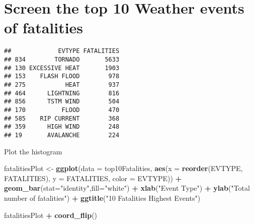 \documentclass[
]{article}
\newenvironment{Shaded}{\begin{snugshade}}{\end{snugshade}}
\newcommand{\DataTypeTok}[1]{\textcolor[rgb]{0.13,0.29,0.53}{#1}}
\newcommand{\DecValTok}[1]{\textcolor[rgb]{0.00,0.00,0.81}{#1}}
\newcommand{\KeywordTok}[1]{\textcolor[rgb]{0.13,0.29,0.53}{\textbf{#1}}}
\newcommand{\NormalTok}[1]{#1}
\newcommand{\OperatorTok}[1]{\textcolor[rgb]{0.81,0.36,0.00}{\textbf{#1}}}
\newcommand{\StringTok}[1]{\textcolor[rgb]{0.31,0.60,0.02}{#1}}
\begin{document}
\hypertarget{screen-the-top-10-weather-events-of-fatalities}{%
\section{Screen the top 10 Weather events of
fatalities}\label{screen-the-top-10-weather-events-of-fatalities}}

\begin{Shaded}
\end{Shaded}

\begin{verbatim}
##             EVTYPE FATALITIES
## 834        TORNADO       5633
## 130 EXCESSIVE HEAT       1903
## 153    FLASH FLOOD        978
## 275           HEAT        937
## 464      LIGHTNING        816
## 856      TSTM WIND        504
## 170          FLOOD        470
## 585    RIP CURRENT        368
## 359      HIGH WIND        248
## 19       AVALANCHE        224
\end{verbatim}

Plot the histogram

\begin{Shaded}
\begin{Highlighting}[]
\NormalTok{fatalitiesPlot <-}\StringTok{ }\KeywordTok{ggplot}\NormalTok{(}\DataTypeTok{data =}\NormalTok{ top10Fatalities, }\KeywordTok{aes}\NormalTok{(}\DataTypeTok{x =} \KeywordTok{reorder}\NormalTok{(EVTYPE, FATALITIES), }\DataTypeTok{y =}\NormalTok{ FATALITIES, }\DataTypeTok{color =}\NormalTok{ EVTYPE)) }\OperatorTok{+}\StringTok{ }\KeywordTok{geom_bar}\NormalTok{(}\DataTypeTok{stat=}\StringTok{"identity"}\NormalTok{,}\DataTypeTok{fill=}\StringTok{"white"}\NormalTok{) }\OperatorTok{+}\StringTok{ }\KeywordTok{xlab}\NormalTok{(}\StringTok{"Event Type"}\NormalTok{) }\OperatorTok{+}\StringTok{  }\KeywordTok{ylab}\NormalTok{(}\StringTok{"Total number of fatalities"}\NormalTok{) }\OperatorTok{+}\StringTok{  }\KeywordTok{ggtitle}\NormalTok{(}\StringTok{"10 Fatalities Highest Events"}\NormalTok{) }

\NormalTok{fatalitiesPlot }\OperatorTok{+}\StringTok{ }\KeywordTok{coord_flip}\NormalTok{()}
\end{Highlighting}
\end{Shaded}
\end{document}
